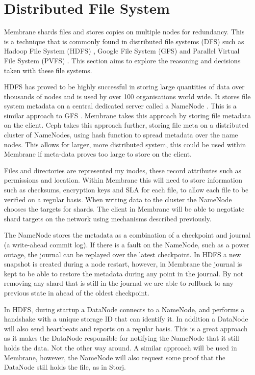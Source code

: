 \documentclass[11pt, a4paper, twocolumn, twoside]{report}
\begin{document}
\section{Distributed File System}

Membrane shards files and stores copies on multiple nodes for redundancy. This is a technique that is commonly found in distributed file systems (DFS) such as Hadoop File System (HDFS) \citep{hdfsAnalysis}, Google File System (GFS) \citep{TheGFS} and Parallel Virtual File System (PVFS) \citep{ross2000pvfs}. This section aims to explore the reasoning and decisions taken with these file systems.

HDFS has proved to be highly successful in storing large quantities of data over thousands of nodes and is used by over 100 organisations world wide. It stores file system metadata on a central dedicated server called a NameNode \citep{hdfsAnalysis}. This is a similar approach to GFS \citep{mckusick2010gfs}. Membrane takes this approach by storing file metadata on the client. Ceph takes this approach further, storing file meta on a distributed cluster of NameNodes, using hash function to spread metadata over the name nodes. \citep{weil2006ceph} This allows for larger, more distributed system, this could be used within Membrane if meta-data proves too large to store on the client.

Files and directories are represented my inodes, these record attributes such as permissions and location. Within Membrane this will need to store information such as checksums, encryption keys and SLA for each file, to allow each file to be verified on a regular basis. When writing data to the cluster the NameNode chooses the targets for shards. The client in Membrane will be able to negotiate shard targets on the network using mechanisms described previously.

The NameNode stores the metadata as a combination of a checkpoint and journal (a write-ahead commit log). If there is a fault on the NameNode, such as a power outage, the journal can be replayed over the latest checkpoint. In HDFS a new snapshot is created during a node restart, however, in Membrane the journal is kept to be able to restore the metadata during any point in the journal. By not removing any shard that is still in the journal we are able to rollback to any previous state in ahead of the oldest checkpoint.

In HDFS, during startup a DataNode connects to a NameNode, and performs a handshake with a unique storage ID that can identify it. In addition a DataNode will also send heartbeats and reports on a regular basis. \cite{hdfsAnalysis} This is a great approach as it makes the DataNode responsible for notifying the NameNode that it still holds the data. Not the other way around. A similar approach will be used in Membrane, however, the NameNode will also request some proof that the DataNode still holds the file, as in Storj.
\end{document}
